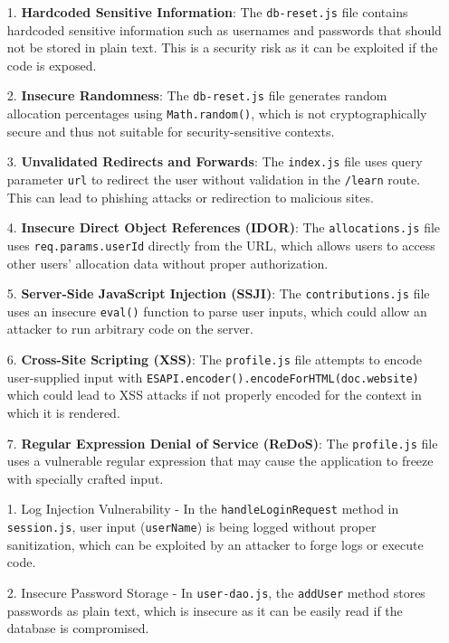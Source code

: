 \begin{enumerate}
  \item[1.] \textbf{Hardcoded Sensitive Information}: The \texttt{db-reset.js} file contains hardcoded sensitive information such as usernames and passwords that should not be stored in plain text. This is a security risk as it can be exploited if the code is exposed.
  \item[2.] \textbf{Insecure Randomness}: The \texttt{db-reset.js} file generates random allocation percentages using \texttt{Math.random()}, which is not cryptographically secure and thus not suitable for security-sensitive contexts.
  \item[3.] \textbf{Unvalidated Redirects and Forwards}: The \texttt{index.js} file uses query parameter \texttt{url} to redirect the user without validation in the \texttt{/learn} route. This can lead to phishing attacks or redirection to malicious sites.
  \item[4.] \textbf{Insecure Direct Object References (IDOR)}: The \texttt{allocations.js} file uses \texttt{req.params.userId} directly from the URL, which allows users to access other users' allocation data without proper authorization.
  \item[5.] \textbf{Server-Side JavaScript Injection (SSJI)}: The \texttt{contributions.js} file uses an insecure \texttt{eval()} function to parse user inputs, which could allow an attacker to run arbitrary code on the server.
  \item[6.] \textbf{Cross-Site Scripting (XSS)}: The \texttt{profile.js} file attempts to encode user-supplied input with \texttt{ESAPI.encoder().encodeForHTML(doc.website)} which could lead to XSS attacks if not properly encoded for the context in which it is rendered.
  \item[7.] \textbf{Regular Expression Denial of Service (ReDoS)}: The \texttt{profile.js} file uses a vulnerable regular expression that may cause the application to freeze with specially crafted input. \\
  \item[1.] Log Injection Vulnerability - In the \texttt{handleLoginRequest} method in \texttt{session.js}, user input (\texttt{userName}) is being logged without proper sanitization, which can be exploited by an attacker to forge logs or execute code.
  \item[2.] Insecure Password Storage - In \texttt{user-dao.js}, the \texttt{addUser} method stores passwords as plain text, which is insecure as it can be easily read if the database is compromised.

\end{enumerate}
